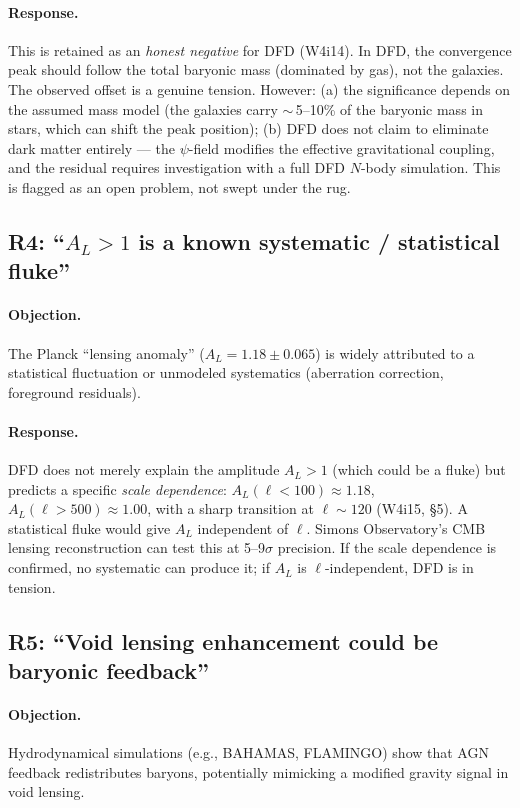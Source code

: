\documentclass[11pt,a4paper]{article}
\begin{document}
\paragraph{Response.}
This is retained as an \emph{honest negative} for DFD (W4i14).  In DFD,
the convergence peak should follow the total baryonic mass (dominated
by gas), not the galaxies.  The observed offset is a genuine tension.
However: (a) the significance depends on the assumed mass model (the
galaxies carry $\sim$\,5--10\% of the baryonic mass in stars, which
can shift the peak position); (b) DFD does not claim to eliminate
dark matter entirely --- the $\psi$-field modifies the effective
gravitational coupling, and the residual requires investigation with
a full DFD $N$-body simulation.  This is flagged as an open problem,
not swept under the rug.

\subsection{R4: ``$A_L > 1$ is a known systematic / statistical fluke''}

\paragraph{Objection.}
The Planck ``lensing anomaly'' ($A_L = 1.18 \pm 0.065$) is widely
attributed to a statistical fluctuation or unmodeled systematics
(aberration correction, foreground residuals).

\paragraph{Response.}
DFD does not merely explain the amplitude $A_L > 1$ (which could be a
fluke) but predicts a specific \emph{scale dependence}: $A_L(\ell < 100)
\approx 1.18$, $A_L(\ell > 500) \approx 1.00$, with a sharp transition
at $\ell \sim 120$ (W4i15, \S5).  A statistical fluke would give
$A_L$ independent of $\ell$.  Simons Observatory's CMB lensing
reconstruction can test this at 5--9$\sigma$ precision.  If the
scale dependence is confirmed, no systematic can produce it; if
$A_L$ is $\ell$-independent, DFD is in tension.

\subsection{R5: ``Void lensing enhancement could be baryonic feedback''}

\paragraph{Objection.}
Hydrodynamical simulations (e.g., BAHAMAS, FLAMINGO) show that AGN
feedback redistributes baryons, potentially mimicking a modified
gravity signal in void lensing.
\end{document}
